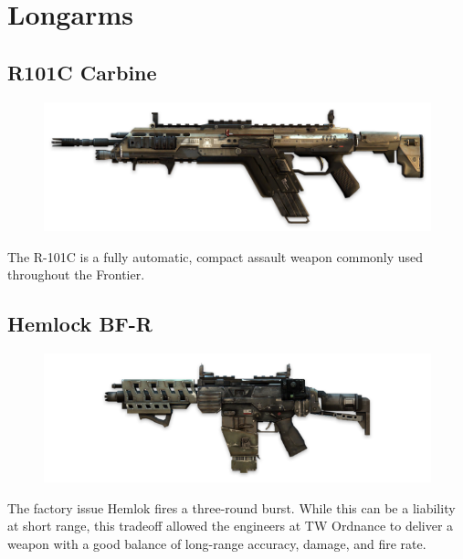 \documentclass[9pt, openany]{extbook}
\begin{document}
\pagebreak
\section{Longarms}
\label{sec:rifles}

\subsection{R101C Carbine}
\begin{figure}
\vspace*{-2em}
\includegraphics[width=\linewidth]{R101CCarbine}
\end{figure}


The R-101C is a fully automatic, compact assault weapon commonly used throughout the Frontier. 


\subsection{Hemlock BF-R}
\begin{figure}
\vspace*{-2em}
\includegraphics[width=\linewidth]{HemlokBFR}
\end{figure}
The factory issue Hemlok fires a three-round burst. While this can be a liability at short range, this tradeoff allowed the engineers at TW Ordnance to deliver a weapon with a good balance of long-range accuracy, damage, and fire rate.
\end{document}
